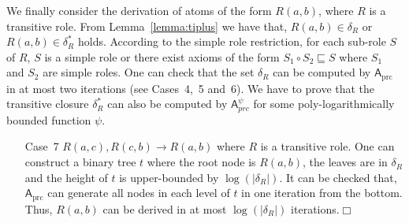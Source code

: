 We finally consider the derivation of atoms of the form $R(a,b)$, where $R$
is a transitive role.
From Lemma~\ref{lemma:tiplus} we have that, $R(a,b)\in\delta_R$ or
$R(a,b)\in\delta^*_R$ holds.
According to the simple role restriction, for each sub-role $S$ of $R$, $S$ is a simple role
or there exist axioms
of the form $S_1\circ S_2\sqsubseteq S$ where $S_1$ and $S_2$ are simple roles.
One can check that the set $\delta_R$ can be computed by $\mathsf{A}_{\text{prc}}$ in
at most two iterations (see Cases~4,~5 and~6).
We have to prove that the transitive closure $\delta^*_R$
can also be computed by $\mathsf{A}_{prc}^\psi$ for some
poly-logarithmically bounded function $\psi$.

\begin{enumerate}[leftmargin=12ex]
\item[Case~7] $R(a,c),R(c,b)\rightarrow R(a,b)$ where $R$ is a transitive role.
    One can construct a binary tree $t$ where the root node is $R(a,b)$,
    the leaves are in $\delta_R$ and the height of $t$ is upper-bounded by
    $\log(|\delta_R|)$. It can be checked that, $\mathsf{A}_{\text{prc}}$ can generate
    all nodes in each level of $t$ in one iteration from the bottom. Thus,
    $R(a,b)$ can be derived in at most $\log(|\delta_R|)$ iterations.\hfill$\Box$
\end{enumerate}




